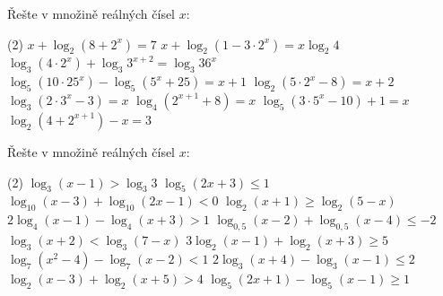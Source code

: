 \documentclass[12pt,a4paper]{article}
\begin{document}
\begin{exercise}
    Řešte v množině reálných čísel $x$:
    \begin{tasks}(2)
        \task $x + \log_{2}\!\left(8 + 2^{x}\right) = 7$
        \task $x + \log_{2}\!\left(1 - 3\cdot 2^{x}\right) = x \log_{2} 4$
        \task $\log_{3}\!\left(4\cdot 2^{x}\right) + \log_{3} 3^{x+2} = \log_{3} 36^{x}$
        \task $\log_{5}\!\left(10\cdot 25^{x}\right) - \log_{5}\!\left(5^{x} + 25\right) = x + 1$
        \task $\log_{2}\!\left(5\cdot 2^{x} - 8\right) = x + 2$
        \task $\log_{3}\!\left(2\cdot 3^{x} - 3\right) = x$
        \task $\log_{4}\!\left(2^{x+1} + 8\right) = x$
        \task {}
        \task $\log_{5}\!\left(3\cdot 5^{x} - 10\right) + 1 = x$
        \task $\log_{2}\!\left(4 + 2^{x+1}\right) - x = 3$
    \end{tasks}
\end{exercise}


\setcounter{section}{2}
\begin{exercise}
    Řešte v množině reálných čísel $x$:
    \begin{tasks}(2)
        \task $\log_{3}(x-1) > \log_{3} 3$
        \task $\log_{5}(2x+3) \leq 1$
        \task $\log_{10}(x-3) + \log_{10}(2x-1) < 0$
        \task $\log_{2}(x+1) \geq \log_{2}(5 - x)$
        \task $2\log_{4}(x-1) - \log_{4}(x+3) > 1$
        \task $\log_{0{,}5}(x-2) + \log_{0{,}5}(x-4) \leq -2$
        \task $\log_{3}(x+2) < \log_{3}(7 - x)$
        \task $3\log_{2}(x-1) + \log_{2}(x+3) \geq 5$
        \task $\log_{7}(x^{2} - 4) - \log_{7}(x - 2) < 1$
        \task $2\log_{3}(x + 4) - \log_{3}(x - 1) \leq 2$
        \task $\log_{2}(x - 3) + \log_{2}(x + 5) > 4$
        \task $\log_{5}(2x + 1) - \log_{5}(x - 1) \geq 1$
    \end{tasks}
\end{exercise}
\end{document}

